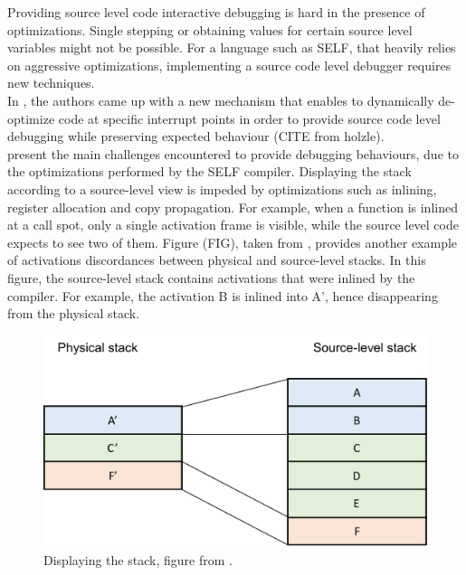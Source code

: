 Providing source level code interactive debugging is hard in the presence of optimizations.
Single stepping or obtaining values for certain source level variables might not be possible.
For a language such as SELF, that heavily relies on aggressive optimizations, implementing a source code level debugger requires new techniques.\\

In \cite{holzle1992debugging}, the authors came up with a new mechanism that enables to dynamically de-optimize code at specific interrupt points in order to provide source code level debugging while preserving expected behaviour (CITE from holzle).\\

 present the main challenges encountered to provide debugging behaviours, due to the optimizations performed by the SELF compiler. 
Displaying the stack according to a source-level view is impeded by optimizations such as inlining, register allocation and copy propagation.
For example, when a function is inlined at a call spot, only a single activation frame is visible, while the source level code expects to see two of them.
Figure (FIG), taken from \cite{holzle1992debugging}, provides another example of activations discordances between physical and source-level stacks.
In this figure, the source-level stack contains activations that were inlined by the compiler. For example, the activation B is inlined into A', hence disappearing from the physical stack.\\
\begin{figure}[h]
\centering
\includegraphics[scale=0.5]{Figures/Figure1}
\decoRule
\caption[physical vs. source-level stacks]{Displaying the stack, figure from \cite{holzle1992debugging}.}
\end{figure}

